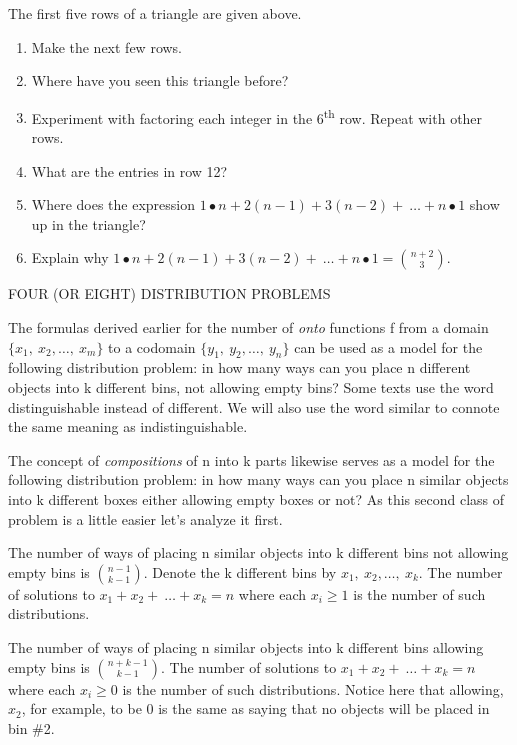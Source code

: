 The first five rows of a triangle are given above.
\begin{enumerate}
\def\labelenumi{\arabic{enumi}.}

\item
  Make the next few rows.
\item
  Where have you seen this triangle before?
\item
  Experiment with factoring each integer in the 6\textsuperscript{th}
  row. Repeat with other rows.
\item
  What are the entries in row 12?
\item
  Where does the expression
  \(1 \bullet n + 2\left( n - 1 \right) + 3\left( n - 2 \right) + \ \ldots + n \bullet 1\)
  show up in the triangle?
\item
  Explain why
  \(1 \bullet n + 2\left( n - 1 \right) + 3\left( n - 2 \right) + \ \ldots + n \bullet 1 =
\binom{n + 2}{3}
\).

\end{enumerate}

FOUR (OR EIGHT) DISTRIBUTION PROBLEMS

The formulas derived earlier for the number of \emph{onto} functions f
from a domain \(\{ x_{1},\ x_{2},\ldots,\ x_{m}\}\) to a codomain
\(\{ y_{1},\ y_{2},\ldots,\ y_{n}\}\) can be used as a model for the
following distribution problem: in how many ways can you place n
different objects into k different bins, not allowing empty bins? Some
texts use the word distinguishable instead of different. We will also
use the word similar to connote the same meaning as indistinguishable.

The concept of \emph{compositions} of n into k parts likewise serves as
a model for the following distribution problem: in how many ways can you
place n similar objects into k different boxes either allowing empty
boxes or not? As this second class of problem is a little easier let's
analyze it first.

\begin{result}The number of ways of placing n similar objects into k different
bins not allowing empty bins is \(\binom{n - 1}{k - 1}
\). Denote the k different bins by
\(x_{1},\ x_{2},\ldots,\ x_{k}\). The number of solutions to
\(x_{1} + x_{2} + \ \ldots + x_{k} = n\) where each \(x_{i} \geq 1\) is
the number of such distributions.
\end{result}

\begin{result}  The number of ways of placing n similar objects into k different
  bins allowing empty bins is \(\binom{n + k - 1}{k - 1}
  \). The number of solutions to
  \(x_{1} + x_{2} + \ \ldots + x_{k} = n\) where each \(x_{i} \geq 0\) is
  the number of such distributions. Notice here that allowing, \(x_{2}\),
  for example, to be 0 is the same as saying that no objects will be
  placed in bin \#2.
\end{result}

